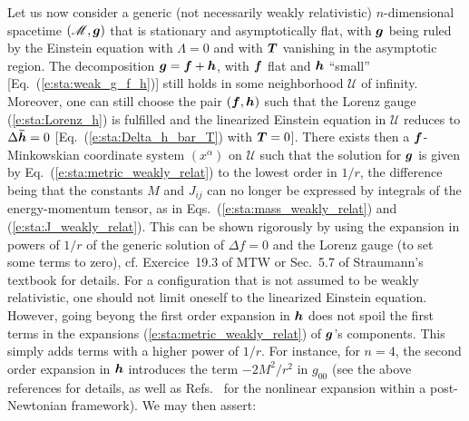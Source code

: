 Let us now consider a generic (not necessarily weakly relativistic) $n$-dimensional spacetime
$(\mathscr{M},\bm{g})$ that is stationary and asymptotically flat, with $\bm{g}$
being ruled by the Einstein equation with $\Lambda=0$ and with $\bm{T}$ vanishing in the
asymptotic region.
The decomposition $\bm{g} = \bm{f} + \bm{h}$, with $\bm{f}$ flat and $\bm{h}$ ``small''
[Eq.~(\ref{e:sta:weak_g_f_h})] still holds in some neighborhood $\mathscr{U}$ of infinity.
Moreover, one can still choose the pair $(\bm{f},\bm{h})$ such that
the Lorenz gauge (\ref{e:sta:Lorenz_h}) is fulfilled and
the linearized Einstein equation in $\mathscr{U}$ reduces to $\Delta \bm{\bar{h}} = 0$
[Eq.~(\ref{e:sta:Delta_h_bar_T}) with $\bm{T} = 0$].
There exists then a $\bm{f}$-Minkowskian coordinate system $(x^\alpha)$ on $\mathscr{U}$
such that the solution for $\bm{g}$ is given
by Eq.~(\ref{e:sta:metric_weakly_relat}) to the lowest order in $1/r$,
the difference being that the constants
$M$ and $J_{ij}$ can no longer be expressed by integrals of the energy-momentum
tensor, as in Eqs.~(\ref{e:sta:mass_weakly_relat}) and (\ref{e:sta:J_weakly_relat}).
This can be shown rigorously by using the expansion in powers of $1/r$ of
the generic solution of $\Delta f = 0$ and the Lorenz
gauge (to set some terms to zero), cf. Exercice~19.3 of MTW \cite{MisneTW73}
or Sec.~5.7 of Straumann's textbook \cite{Strau13} for details.
For a configuration that is not assumed to be weakly relativistic, one
should not limit oneself to the linearized Einstein equation.
However, going beyong the first order expansion in $\bm{h}$
does not spoil the first terms in the expansions (\ref{e:sta:metric_weakly_relat}) of
$\bm{g}$'s components. This simply adds terms with a higher power
of $1/r$. For instance, for $n=4$, the second order expansion in $\bm{h}$ introduces
the term $-2M^2/r^2$ in $g_{00}$ (see the above references for details, as well
as Refs.~\cite{Blanc14,PoissW14} for the nonlinear expansion within a post-Newtonian framework).
We may then assert:


